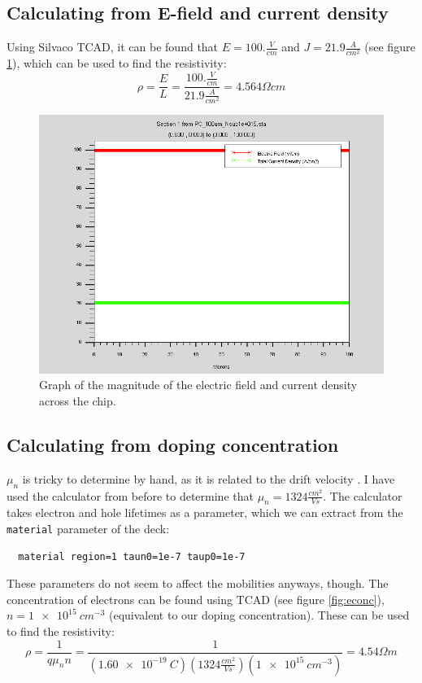 \documentclass[12pt]{article}
\begin{document}
\subsection{Calculating from E-field and current density}
Using Silvaco TCAD, it can be found that $E=100.\frac{V}{cm}$ and $J=21.9\frac{A}{cm^2}$ (see figure \ref{fig:efieldcurrentdensity}), which can be used to find the resistivity:
\begin{equation}
  \rho=\frac{E}{L}=\frac{100.\frac{V}{cm}}{21.9\frac{A}{cm^2}}=4.564{\Omega}cm
\end{equation}
\begin{figure}[H]
  \centering
  \includegraphics[width=\textwidth]{efieldcurrentdensity}
  \caption{Graph of the magnitude of the electric field and current density across the chip.}
  \label{fig:efieldcurrentdensity}
\end{figure}

\subsection{Calculating from doping concentration}
$\mu_n$ is tricky to determine by hand, as it is related to the drift velocity \citep{wikipedia_mobility}. I have used the calculator from before to determine that $\mu_n=1324\frac{cm^2}{Vs}$. The calculator takes electron and hole lifetimes as a parameter, which we can extract from the \lstinline{material} parameter of the deck:
\begin{lstlisting}
  material region=1 taun0=1e-7 taup0=1e-7
\end{lstlisting}
These parameters do not seem to affect the mobilities anyways, though. The concentration of electrons can be found using TCAD (see figure \ref{fig:econc}), $n=\SI{1e15}{cm^{-3}}$ (equivalent to our doping concentration). These can be used to find the resistivity:
\begin{equation}
  \rho=\frac{1}{q\mu_nn}=\frac{1}{(\SI{1.60e-19}{C})(1324\frac{cm^2}{Vs})(\SI{1e15}{cm^{-3}})}=4.54{\Omega}m
\end{equation}
\end{document}

